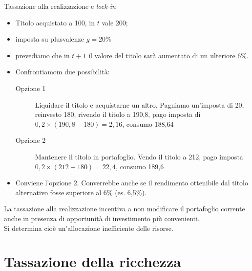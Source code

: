 \documentclass[aspectratio=64,11pt]{beamer}
\begin{document}
\begin{frame}{Tassazione alla realizzazione e \emph{lock-in}}
\begin{itemize}
\item Titolo acquistato a 100, in $t$ vale 200;
\item imposta su plusvalenze $g=20\%$
\item prevediamo che in $t+1$ il valore del titolo sarà aumentato di un ulteriore 6\%.
\item Confrontiamom due possibilità:
  \begin{description}
  \item[{Opzione 1}] Liquidare il titolo e acquistarne un altro. Pagniamo
    un'imposta di 20, reinvesto 180, rivendo il titolo a 190,8, pago imposta
    di $0,2\times(190,8-180)=2,16$, consumo 188,64
  \item[{Opzione 2}] Mantenere il titolo in portafoglio. Vendo il titolo a
    212, pago imposta $0,2\times(212-180)=22,4$, consumo 189,6
  \end{description}
\item Conviene l'opzione 2. Converrebbe anche se il rendimento ottenibile dal
  titolo alternativo fosse superiore al 6\% (es. 6,5\%).
\end{itemize}
La tassazione alla realizzazione incentiva a non modificare il portafoglio
corrente
\alert{anche in presenza di opportunità di investimento più convenienti}.\\
Si determina cioè \alert{un'allocazione inefficiente delle risorse}.
\end{frame}

\section{Tassazione della ricchezza}
\end{document}
